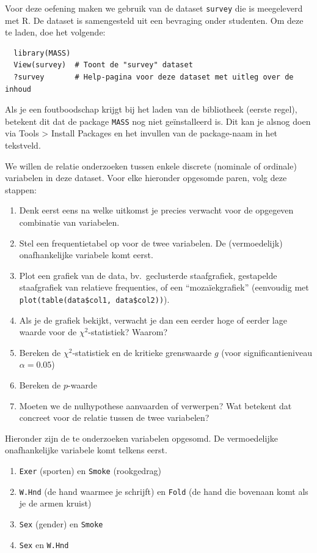 \begin{exercise}
  \label{ex:chisq-survey}
  Voor deze oefening maken we gebruik van de dataset \texttt{survey} die is meegeleverd met R. De dataset is samengesteld uit een bevraging onder studenten. Om deze te laden, doe het volgende:
  
  \begin{lstlisting}
  library(MASS)
  View(survey)  # Toont de "survey" dataset
  ?survey       # Help-pagina voor deze dataset met uitleg over de inhoud
  \end{lstlisting}
  
  Als je een foutboodschap krijgt bij het laden van de bibliotheek (eerste regel), betekent dit dat de package \texttt{MASS} nog niet geïnstalleerd is. Dit kan je alsnog doen via Tools > Install Packages en het invullen van de package-naam in het tekstveld.
  
  We willen de relatie onderzoeken tussen enkele discrete (nominale of ordinale) variabelen in deze dataset. Voor elke hieronder opgesomde paren, volg deze stappen:
  
  \begin{enumerate}[label=(\alph*)]
    \item Denk eerst eens na welke uitkomst je precies verwacht voor de opgegeven combinatie van variabelen.
    \item Stel een frequentietabel op voor de twee variabelen. De (vermoedelijk) onafhankelijke variabele komt eerst.
    \item Plot een grafiek van de data, bv.~geclusterde staafgrafiek, gestapelde staafgrafiek van relatieve frequenties, of een ``mozaïekgrafiek'' (eenvoudig met \texttt{plot(table(data\$col1, data\$col2))}).
    \item Als je de grafiek bekijkt, verwacht je dan een eerder hoge of eerder lage waarde voor de $\chi^2$-statistiek? Waarom?
    \item Bereken de $\chi^2$-statistiek en de kritieke grenswaarde $g$ (voor significantieniveau $\alpha = 0.05$)
    \item Bereken de $p$-waarde
    \item Moeten we de nulhypothese aanvaarden of verwerpen? Wat betekent dat concreet voor de relatie tussen de twee variabelen?
  \end{enumerate}
  
  Hieronder zijn de te onderzoeken variabelen opgesomd. De vermoedelijke onafhankelijke variabele komt telkens eerst.
  
  \begin{enumerate}
    \item \texttt{Exer} (sporten) en \texttt{Smoke} (rookgedrag)
    \item \texttt{W.Hnd} (de hand waarmee je schrijft) en \texttt{Fold} (de hand die bovenaan komt als je de armen kruist)
    \item \texttt{Sex} (gender) en \texttt{Smoke}
    \item \texttt{Sex} en \texttt{W.Hnd}
  \end{enumerate}
\end{exercise}

